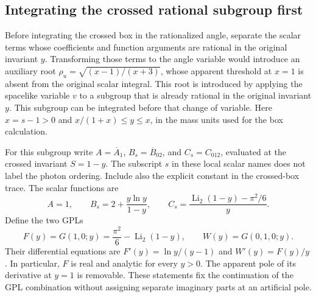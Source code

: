\subsection{Integrating the crossed rational subgroup first}
\label{sec:comp-crossed-first}
Before integrating the crossed box in the rationalized angle, separate
the scalar terms whose coefficients and function arguments are rational
in the original invariant $y$.
Transforming those terms to the angle variable would introduce an auxiliary root $\rho_u=\sqrt{(x-1)/(x+3)}$, whose
apparent threshold at $x=1$ is absent from the original scalar
integral. This root is introduced by applying the spacelike
variable $v$ to a subgroup that is already rational in the
original invariant $y$.
This subgroup can be integrated before that change of variable.
Here $x=s-1>0$ and $x/(1+x)\leq y\leq x$, in the mass units
used for the box calculation.

For this subgroup write $A=\overline A_1$, $B_s=\overline B_{02}$,
and $C_s=C_{012}$, evaluated at the crossed invariant $S=1-y$.
The subscript $s$ in these local scalar names does not label the
photon ordering. Include also the explicit constant in the crossed-box
trace. The scalar functions are
\begin{equation}
 A=1,\qquad B_s=2+\frac{y\ln y}{1-y},\qquad
 C_s=\frac{\operatorname{Li}_2(1-y)-\pi^2/6}{y}.
\end{equation}
Define the two GPLs
\begin{equation}
 F(y)=G(1,0;y)=\frac{\pi^2}{6}-\operatorname{Li}_2(1-y),
 \qquad W(y)=G(0,1,0;y).
\end{equation}
Their differential equations are
$F'(y)=\ln y/(y-1)$ and $W'(y)=F(y)/y$.
In particular, $F$ is real and analytic for every $y>0$.
The apparent pole of its derivative at $y=1$ is removable.
These statements fix the continuation of the GPL combination
without assigning separate imaginary parts at an artificial pole.

